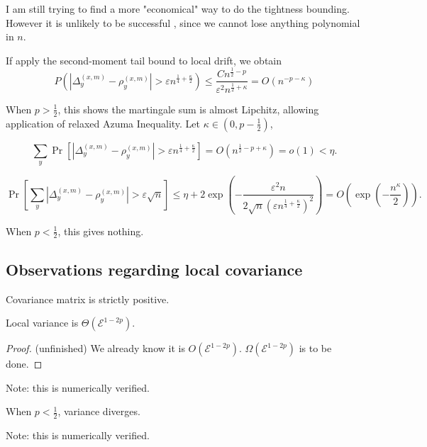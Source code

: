 I am still trying to find a more "economical" way to do the tightness bounding. However it is unlikely to be successful , since we cannot lose anything polynomial in $n$.

If apply the second-moment tail bound to local drift, we obtain
\[
	P\left( \left| \Delta_y^{(x,m)} - \rho_y^{(x,m)} \right| > \varepsilon n^{\frac{1}{4} + \frac{\kappa}{2}}  \right)
	\le  \frac{C n^{\frac{1}{2} - p}}{\varepsilon^2 n^{\frac{1}{2} + \kappa}} = O(n^{-p - \kappa})
\]

When $p > \frac{1}{2}$, this shows the martingale sum is almost Lipchitz, allowing application of relaxed Azuma Inequality. Let $\kappa \in (0,p - \frac{1}{2})$,

\[
	\sum_y \operatorname{Pr} \left[ \left| \Delta_y^{(x,m)} - \rho_y^{(x,m)} \right| >  \varepsilon n^{\frac{1}{4} + \frac{\kappa}{2}} \right]
	= O\left( n^{\frac{1}{2} - p + \kappa} \right) 
	= o(1)
	< \eta
.\] 

\[
	\operatorname{Pr} \left[ \sum_y  \left| \Delta_y^{(x,m)} - \rho_y^{(x,m)} \right| >  \varepsilon \sqrt{n}  \right]
	\le \eta + 
	2 \exp\left( - \frac{\varepsilon^2 n}{ 2 \sqrt{n} (\varepsilon n^{\frac{1}{4} + \frac{\kappa}{2}})^2 } \right) 
	= O\left( \exp\left( - \frac{n^\kappa}{2} \right)  \right)   
.\] 



When $p < \frac{1}{2}$, this gives nothing.


\subsection{Observations regarding local covariance}

\begin{lemma}
	Covariance matrix is strictly positive.
\end{lemma}
\begin{lemma}
	Local variance is $\Theta(\mathcal{E}^{1 - 2p})$.
	\label{lemma:local-variance-exact}
\end{lemma}
\begin{proof}
	(unfinished)
	We already know it is $O(\mathcal{E}^{1 - 2p})$. $\Omega(\mathcal{E}^{1 - 2p})$ is to be done.
\end{proof}

Note: this is numerically verified.

\begin{corollary}
	When $p < \frac{1}{2}$, variance diverges.
\end{corollary}
Note: this is numerically verified.

